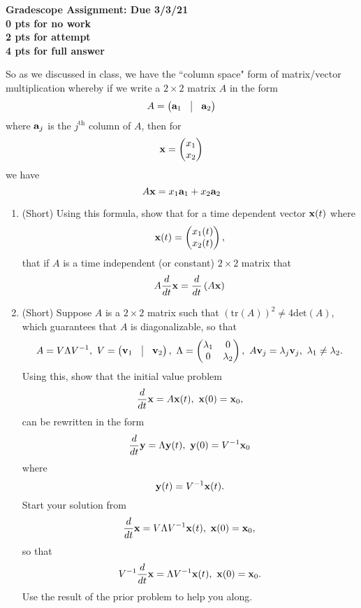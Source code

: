 \documentclass[a4paper,11pt]{article}
\newcommand{\bp}{\begin{pmatrix}}
\newcommand{\ep}{\end{pmatrix}}
\begin{document}
\begin{center}
{\bf Gradescope Assignment: Due 3/3/21\\
0 pts for no work\\ 2 pts for attempt\\ 4 pts for full answer}
\end{center}
So as we discussed in class, we have the ``column space" form of matrix/vector multiplication whereby if we write a $2\times 2$ matrix $A$ in the form 
\[
A = \bp {\bf a}_{1} & \vline & {\bf a}_{2}  \ep
\]
where ${\bf a}_{j}$ is the $j^{\text{th}}$ column of $A$, then for 
\[
{\bf x} = \bp x_{1} \\ x_{2}\ep
\]
we have 
\[
A{\bf x} = x_{1}{\bf a}_{1}  + x_{2}{\bf a}_{2}
\]
\begin{enumerate}
\item (Short) Using this formula, show that for a time dependent vector ${\bf x}(t)$ where
\[
{\bf x}(t) = \bp x_{1}(t) \\ x_{2}(t)\ep,
\]
that if $A$ is a time independent (or constant) $2\times 2$ matrix that 
\[
A\frac{d}{dt}{\bf x} = \frac{d}{dt}\left(A{\bf x}\right) 
\]
\item (Short) Suppose $A$ is a $2\times 2$ matrix such that $(\text{tr}(A))^{2}\neq 4\text{det}(A)$, which guarantees that $A$ is diagonalizable, so that 
\[
A = V\Lambda V^{-1}, ~ V = \bp {\bf v}_{1} & \vline & {\bf v}_{2}  \ep, ~ \Lambda = \bp \lambda_{1} & 0 \\ 0 & \lambda_{2} \ep, ~ A{\bf v}_{j} = \lambda_{j}{\bf v}_{j}, ~ \lambda_{1}\neq \lambda_{2}.
\]
Using this, show that the initial value problem
\[
\frac{d}{dt}{\bf x} = A{\bf x}(t), ~ {\bf x}(0) = {\bf x}_{0},
\]
can be rewritten in the form 
\[
\frac{d}{dt}{\bf y} = \Lambda{\bf y}(t), ~ {\bf y}(0) = V^{-1}{\bf x}_{0}
\]
where 
\[
{\bf y}(t) = V^{-1}{\bf x}(t).
\]
Start your solution from 
\[
\frac{d}{dt}{\bf x} = V\Lambda V^{-1}{\bf x}(t), ~ {\bf x}(0) = {\bf x}_{0},
\]
so that 
\[
V^{-1}\frac{d}{dt}{\bf x} = \Lambda V^{-1}{\bf x}(t), ~ {\bf x}(0) = {\bf x}_{0}.
\]
Use the result of the prior problem to help you along.  

\end{enumerate}
\end{document}
